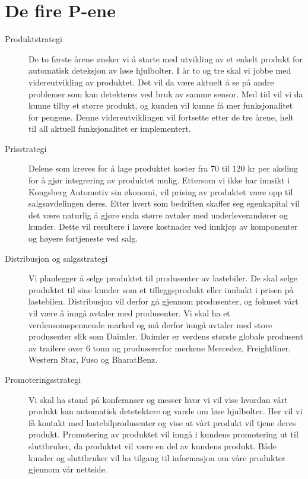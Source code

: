\section{De fire P-ene}
\begin{description}
	\item[Produktstrategi] De to første årene ønsker vi å starte med utvikling av et enkelt produkt for 		automatisk deteksjon av løse hjulbolter. I år to og tre skal vi jobbe med videreutvikling av 				produktet. Det vil da være aktuelt å se på andre problemer som kan detekteres ved bruk av 			samme sensor. Med tid vil vi da kunne tilby et større produkt, og kunden vil kunne få mer 			funksjonalitet for pengene. Denne videreutviklingen vil fortsette etter de tre årene, helt til all aktuell 		funksjonalitet er implementert.
	\item[Prisstrategi] Delene som kreves for å lage produktet koster fra 70 til 120 kr per aksling for å gjør integrering av produktet mulig. Ettersom vi ikke har innsikt i Kongsberg Automotiv sin økonomi, vil prising av produktet være opp til salgsavdelingen deres. Etter hvert som bedriften skaffer seg egenkapital vil det være naturlig å gjøre enda større avtaler med underleverandører og kunder. Dette vil resultere i lavere kostnader ved innkjøp av komponenter og høyere fortjeneste ved salg.
	\item[Distribusjon og salgsstrategi] Vi planlegger å selge produktet til produsenter av lastebiler. De 		skal selge produktet til sine kunder som et tilleggsprodukt eller innbakt i prisen på lastebilen. 			Distribusjon vil derfor gå gjennom produsenter, og fokuset vårt vil være å inngå avtaler med 			produsenter. Vi skal ha et verdensomspennende marked og må derfor inngå avtaler med store 		produsenter slik som Daimler\cite{daimler}. Daimler er verdens største globale produsent av 				trailere over 6 tonn og produsererfor merkene Mercedez, Freightliner, Western Star, Fuso og 			BharatBenz.
	\item[Promoteringsstrategi] Vi skal ha stand på konferanser og messer hvor vi vil vise hvordan vårt 	produkt kan automatisk detetektere og varsle om løse hjulbolter. Her vil vi få kontakt med 			lastebilprodusenter og vise at vårt produkt vil tjene deres produkt. Promotering av produktet vil 		inngå i kundens promotering ut til sluttbruker, da produktet vil være en del av kundens produkt. 		Både kunder og 	sluttbruker vil ha tilgang til informasjon om våre produkter gjennom vår nettside.
\end{description}